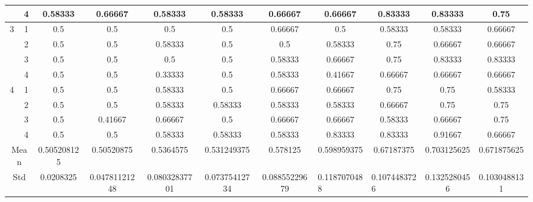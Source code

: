 \documentclass[draft,dvipsnames]{drexel-thesis}
\begin{document}
\begin{thesis}
\begin{table}[!t]
{\begin{tabular}{|c|c|c|c|c|c|c|c|c|c|c|}
                      & 4                   & 0.58333     & 0.66667       & 0.58333       & 0.58333       & 0.66667       & 0.66667                           & 0.83333                           & 0.83333      & 0.75         \\ \hline
\multirow{4}{*}{3}    & 1                   & 0.5         & 0.5           & 0.5           & 0.5           & 0.66667       & 0.5                               & 0.58333                           & 0.58333      & 0.66667      \\ \cline{2-11} 
                      & 2                   & 0.5         & 0.5           & 0.58333       & 0.5           & 0.5           & 0.58333                           & 0.75                              & 0.66667      & 0.66667      \\ \cline{2-11} 
                      & 3                   & 0.5         & 0.5           & 0.5           & 0.5           & 0.58333       & 0.66667                           & 0.75                              & 0.83333      & 0.83333      \\ \cline{2-11} 
                      & 4                   & 0.5         & 0.5           & 0.33333       & 0.5           & 0.58333       & 0.41667                           & 0.66667                           & 0.66667      & 0.66667      \\ \hline
\multirow{4}{*}{4}    & 1                   & 0.5         & 0.5           & 0.58333       & 0.5           & 0.66667       & 0.66667                           & 0.75                              & 0.75         & 0.58333      \\ \cline{2-11} 
                      & 2                   & 0.5         & 0.5           & 0.58333       & 0.58333       & 0.58333       & 0.58333                           & 0.66667                           & 0.75         & 0.75         \\ \cline{2-11} 
                      & 3                   & 0.5         & 0.41667       & 0.66667       & 0.5           & 0.66667       & 0.66667                           & 0.58333                           & 0.66667      & 0.75         \\ \cline{2-11} 
                      & 4                   & 0.5         & 0.5           & 0.58333       & 0.58333       & 0.58333       & 0.83333                           & 0.83333                           & 0.91667      & 0.66667      \\ \hline
\multicolumn{2}{|c|}{Mean}                  & 0.505208125 & 0.50520875    & 0.5364575     & 0.531249375   & 0.578125      & 0.598959375                       & 0.67187375                        & 0.703125625  & 0.671875625  \\ \hline
\multicolumn{2}{|c|}{Std}                   & 0.0208325   & 0.04781121248 & 0.08032837701 & 0.07375412734 & 0.08855229679 & \multicolumn{1}{l|}{0.1187070488} & \multicolumn{1}{l|}{0.1074483726} & 0.1325280456 & 0.1030488131 \\ \hline
\end{tabular}}
\end{table}




\end{thesis}
\end{document}

